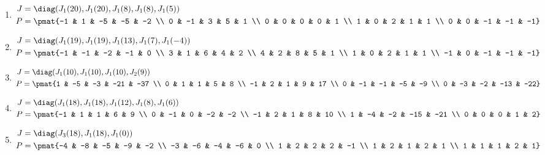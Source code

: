 \begin{enumerate}
\item

\begin{align*}
J &= \diag(J_{1}(20), J_{1}(20), J_{1}(8), J_{1}(8), J_{1}(5))\\
P &= \pmat{-1 & 1 & -5 & -5 & -2 \\ 0 & -1 & 3 & 5 & 1 \\ 0 & 0 & 0 & 0 & 1 \\ 1 & 0 & 2 & 1 & 1 \\ 0 & 0 & -1 & -1 & -1}
\end{align*}

\item

\begin{align*}
J &= \diag(J_{1}(19), J_{1}(19), J_{1}(13), J_{1}(7), J_{1}(-4))\\
P &= \pmat{-1 & -1 & -2 & -1 & 0 \\ 3 & 1 & 6 & 4 & 2 \\ 4 & 2 & 8 & 5 & 1 \\ 1 & 0 & 2 & 1 & 1 \\ -1 & 0 & -1 & -1 & -1}
\end{align*}

\item

\begin{align*}
J &= \diag(J_{1}(10), J_{1}(10), J_{1}(10), J_{2}(9))\\
P &= \pmat{1 & -5 & -3 & -21 & -37 \\ 0 & 1 & 1 & 5 & 8 \\ -1 & 2 & 1 & 9 & 17 \\ 0 & -1 & -1 & -5 & -9 \\ 0 & -3 & -2 & -13 & -22}
\end{align*}

\item

\begin{align*}
J &= \diag(J_{1}(18), J_{1}(18), J_{1}(12), J_{1}(8), J_{1}(6))\\
P &= \pmat{-1 & 1 & 1 & 6 & 9 \\ 0 & -1 & 0 & -2 & -2 \\ -1 & 2 & 1 & 8 & 10 \\ 1 & -4 & -2 & -15 & -21 \\ 0 & 0 & 0 & 1 & 2}
\end{align*}

\item

\begin{align*}
J &= \diag(J_{3}(18), J_{1}(18), J_{1}(0))\\
P &= \pmat{-4 & -8 & -5 & -9 & -2 \\ -3 & -6 & -4 & -6 & 0 \\ 1 & 2 & 2 & 2 & -1 \\ 1 & 2 & 1 & 2 & 1 \\ 1 & 1 & 1 & 2 & 1}
\end{align*}


\end{enumerate}
